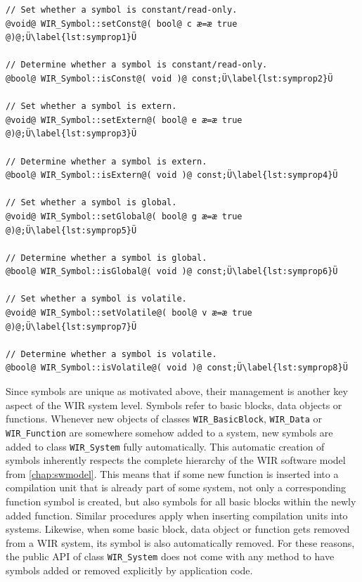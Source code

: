 \begin{lstlisting}[style=code,float=t,caption={Property Handling of Class \texttt{WIR\_Symbol}},label=lst:symprop]
// Set whether a symbol is constant/read-only.
@void@ WIR_Symbol::setConst@( bool@ c æ=æ true @)@;Ü\label{lst:symprop1}Ü

// Determine whether a symbol is constant/read-only.
@bool@ WIR_Symbol::isConst@( void )@ const;Ü\label{lst:symprop2}Ü

// Set whether a symbol is extern.
@void@ WIR_Symbol::setExtern@( bool@ e æ=æ true @)@;Ü\label{lst:symprop3}Ü

// Determine whether a symbol is extern.
@bool@ WIR_Symbol::isExtern@( void )@ const;Ü\label{lst:symprop4}Ü

// Set whether a symbol is global.
@void@ WIR_Symbol::setGlobal@( bool@ g æ=æ true @)@;Ü\label{lst:symprop5}Ü

// Determine whether a symbol is global.
@bool@ WIR_Symbol::isGlobal@( void )@ const;Ü\label{lst:symprop6}Ü

// Set whether a symbol is volatile.
@void@ WIR_Symbol::setVolatile@( bool@ v æ=æ true @)@;Ü\label{lst:symprop7}Ü

// Determine whether a symbol is volatile.
@bool@ WIR_Symbol::isVolatile@( void )@ const;Ü\label{lst:symprop8}Ü
\end{lstlisting}

Since symbols are unique as motivated above, their management is another key aspect of the \gls{WIR} system level.
Symbols refer to basic blocks, data objects or functions.
Whenever new objects of classes \texttt{WIR\_BasicBlock}, \texttt{WIR\_Data} or \texttt{WIR\_Function} are somewhere somehow added to a system, new symbols are added to class \texttt{WIR\_System} fully automatically.
This automatic creation of symbols inherently respects the complete hierarchy of the \gls{WIR} software model from \cref{chap:swmodel}.
This means that if some new function is inserted into a compilation unit that is already part of some system, not only a corresponding function symbol is created, but also symbols for all basic blocks within the newly added function.
Similar procedures apply when inserting compilation units into systems.
Likewise, when some basic block, data object or function gets removed from a \gls{WIR} system, its symbol is also automatically removed.
For these reasons, the public \gls{API} of class \texttt{WIR\_System} does not come with any method to have symbols added or removed explicitly by application code.

